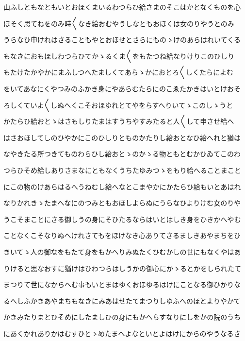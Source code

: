 \documentclass[a4paper,11pt,landscape]{ltjtarticle}
\begin{document}
\par\medskip
山ふしともなともいとおほくまいるわつらひ給さまのそこはかとなくものを心
\par\medskip
ほそく思てねをのみ時〱なき給おむやうしなともおほくは女のりやうとのみ
\par\medskip
うらなひ申けれはさることもやとおほせとさらにものゝけのあらはれいてくる
\par\medskip
もなきにおもほしわつらひてかゝるくま〱をもたつね給なりけりこのひしり
\par\medskip
もたけたかやかにまふしつへたましくてあらゝかにおとろ〱しくたらによむ
\par\medskip
をいてあなにくやつみのふかき身にやあらむたらにのこゑたかきはいとけおそ
\par\medskip
ろしくていよ〱しぬへくこそおほゆれとてやをらすへりいてゝこのしゝうと
\par\medskip
かたらひ給おとゝはさもしりたまはすうちやすみたると人〱して申させ給へ
\par\medskip
はさおほしてしのひやかにこのひしりとものかたりし給おとなひ給へれと猶は
\par\medskip
なやきたる所つきてものわらひし給おとゝのかゝる物ともとむかひゐてこのわ
\par\medskip
つらひそめ給しありさまなにともなくうちたゆみつゝをもり給へることまこと
\par\medskip
にこの物のけあらはるへうねむし給へなとこまやかにかたらひ給もいとあはれ
\par\medskip
なりかれきゝたまへなにのつみともおほしよらぬにうらなひよりけむ女のりや
\par\medskip
うこそまことにさる御しうの身にそひたるならはいとはしき身をひきかへやむ
\par\medskip
ことなくこそなりぬへけれさてもをほけなき心ありてさるましきあやまちをひ
\par\medskip
きいてゝ人の御なをもたて身をもかへりみぬたくひむかしの世にもなくやはあ
\par\medskip
りけると思なおすに猶けはひわつらはしうかの御心にかゝるとかをしられたて
\par\medskip
まつりて世になからへむ事もいとまはゆくおほゆるはけにことなる御ひかりな
\par\medskip
るへしふかきあやまちもなきにみあはせたてまつりしゆふへのほとよりやかて
\par\medskip
かきみたりまとひそめにしたましひの身にもかへらすなりにしをかの院のうち
\par\medskip
にあくかれありかはむすひとゝめたまへよなといとよはけにからのやうなるさ
\par\medskip
\end{document}
